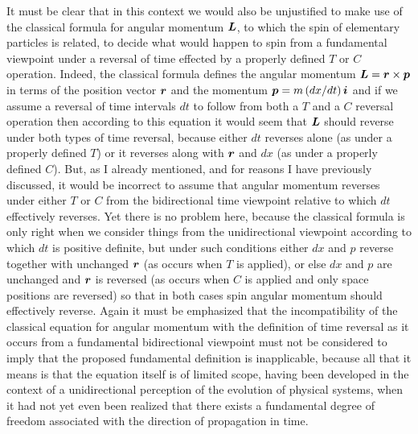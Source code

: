 \documentclass[notitlepage,12pt]{report}
\newcommand{\bm}[1]{\mbox{\boldmath $#1$}}
\begin{document}
It must be clear that in this context we would also be unjustified to make use of the classical formula for angular momentum $\bm{L}$, to which the spin of elementary particles is related, to decide what would happen to spin from a fundamental viewpoint under a reversal of time effected by a properly defined $T$ or $C$ operation. Indeed, the classical formula defines the angular momentum $\bm{L}=\bm{r}\times\bm{p}$ in terms of the position vector $\bm{r}$ and the momentum  $\bm{p}=m\,(dx/dt)\,\bm{i}$ and if we assume a reversal of time intervals $dt$ to follow from both a $T$ and a $C$ reversal operation then according to this equation it would seem that $\bm{L}$ should reverse under both types of time reversal, because either $dt$ reverses alone (as under a properly defined $T$) or it reverses along with $\bm{r}$ and $dx$ (as under a properly defined $C$). But, as I already mentioned, and for reasons I have previously discussed, it would be incorrect to assume that angular momentum reverses under either $T$ or $C$ from the bidirectional time viewpoint relative to which $dt$ effectively reverses. Yet there is no problem here, because the classical formula is only right when we consider things from the unidirectional viewpoint according to which $dt$ is positive definite, but under such conditions either $dx$ and $p$ reverse together with unchanged $\bm{r}$ (as occurs when $T$ is applied), or else $dx$ and $p$ are unchanged and $\bm{r}$ is reversed (as occurs when $C$ is applied and only space positions are reversed) so that in both cases spin angular momentum should effectively reverse. Again it must be emphasized that the incompatibility of the classical equation for angular momentum with the definition of time reversal as it occurs from a fundamental bidirectional viewpoint must not be considered to imply that the proposed fundamental definition is inapplicable, because all that it means is that the equation itself is of limited scope, having been developed in the context of a unidirectional perception of the evolution of physical systems, when it had not yet even been realized that there exists a fundamental degree of freedom associated with the direction of propagation in time.
\end{document}
